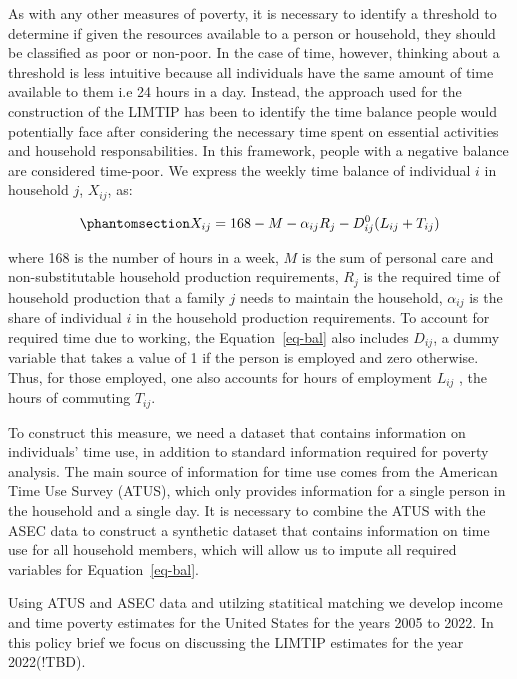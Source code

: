 \documentclass[
  11pt,
]{article}
\begin{document}
As with any other measures of poverty, it is necessary to identify a
threshold to determine if given the resources available to a person or
household, they should be classified as poor or non-poor. In the case of
time, however, thinking about a threshold is less intuitive because all
individuals have the same amount of time available to them i.e 24 hours
in a day. Instead, the approach used for the construction of the LIMTIP
has been to identify the time balance people would potentially face
after considering the necessary time spent on essential activities and
household responsabilities. In this framework, people with a negative
balance are considered time-poor. We express the weekly time balance of
individual \(i\) in household \(j\), \(X_{ij}\), as:

\begin{equation}\phantomsection\label{eq-bal}{X_{ij} = 168 - M - \alpha_{ij}R_j-D_{ij}^0(L_{ij}+T_{ij})
}\end{equation}

where 168 is the number of hours in a week, \(M\) is the sum of personal
care and non-substitutable household production requirements, \(R_j\) is
the required time of household production that a family \(j\) needs to
maintain the household, \(\alpha_{ij}\) is the share of individual \(i\)
in the household production requirements. To account for required time
due to working, the Equation~\ref{eq-bal} also includes \(D_{ij}\), a
dummy variable that takes a value of 1 if the person is employed and
zero otherwise. Thus, for those employed, one also accounts for hours of
employment \(L_{ij}\) , the hours of commuting \(T_{ij}\).

To construct this measure, we need a dataset that contains information
on individuals' time use, in addition to standard information required
for poverty analysis. The main source of information for time use comes
from the American Time Use Survey (ATUS), which only provides
information for a single person in the household and a single day. It is
necessary to combine the ATUS with the ASEC data to construct a
synthetic dataset that contains information on time use for all
household members, which will allow us to impute all required variables
for Equation~\ref{eq-bal}.

Using ATUS and ASEC data and utilzing statitical matching we develop
income and time poverty estimates for the United States for the years
2005 to 2022. In this policy brief we focus on discussing the LIMTIP
estimates for the year 2022(!TBD).
\end{document}
